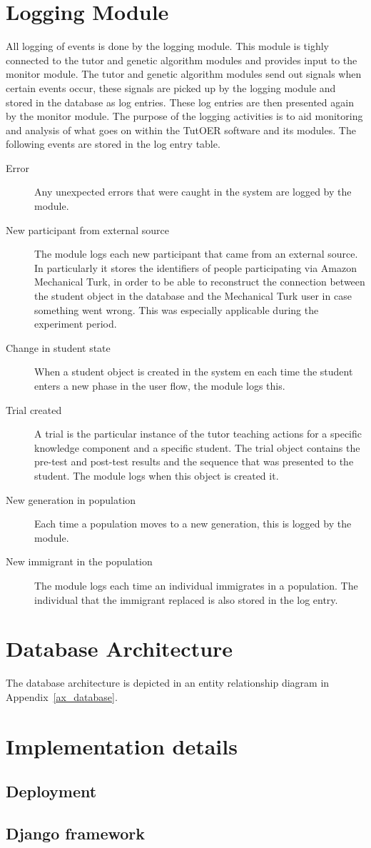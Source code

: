 \section{Logging Module}
\label{sec:software_logging_module}
All logging of events is done by the logging module. This module is tighly
connected to the tutor and genetic algorithm modules and provides input to
the monitor module. The tutor and genetic algorithm modules send out signals
when certain events occur, these signals are picked up by the logging module
and stored in the database as log entries. These log entries are then presented
again by the monitor module. The purpose of the logging activities is to aid
monitoring and analysis of what goes on within the TutOER software and its
modules. The following events are stored in the log entry table.
\begin{description}
	\item[Error] Any unexpected errors that were caught in the system are
		logged by the module.
	\item[New participant from external source] The module logs each new
		participant that came from an external source. In particularly it
		stores the identifiers of people participating via Amazon
		Mechanical Turk, in order to be able to reconstruct the connection
		between the student object in the database and the Mechanical Turk
		user in case something went wrong. This was especially applicable
		during the experiment period.
	\item[Change in student state] When a student object is created in the
		system en each time the student enters a new phase in the user
		flow, the module logs this.
	\item[Trial created] A trial is the particular instance of the tutor
		teaching actions for a specific knowledge component and a specific
		student. The trial object contains the pre-test and post-test
		results and the sequence that was presented to the student. The
		module logs when this object is created it.
	\item[New generation in population] Each time a population moves to a
		new generation, this is logged by the module.
	\item[New immigrant in the population] The module logs each time an
		individual immigrates in a population. The individual that the
		immigrant replaced is also stored in the log entry.
\end{description}
\section{Database Architecture}
\label{sec:software_database}
The database architecture is depicted in an entity relationship diagram in
Appendix~\ref{ax_database}.
\section{Implementation details}
\subsection{Deployment}
\subsection{Django framework}

